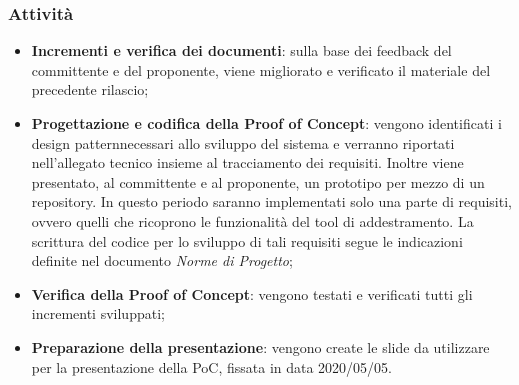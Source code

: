 \subsubsection{Attività}
\begin{itemize}
\item \textbf{Incrementi e verifica dei documenti}: sulla base dei feedback del committente e del proponente, viene migliorato e verificato il materiale del precedente rilascio;
\item \textbf{Progettazione e codifica della Proof of Concept}: vengono identificati i design pattern\glo necessari allo sviluppo del sistema e verranno riportati nell'allegato tecnico insieme al tracciamento dei requisiti. Inoltre viene presentato, al committente e al proponente, un prototipo per mezzo di un repository\glo. In questo periodo saranno implementati solo una parte di requisiti, ovvero quelli che ricoprono le funzionalità del tool di addestramento. La scrittura del codice per lo sviluppo di tali requisiti segue le indicazioni definite nel documento \textit{Norme di Progetto};
\item \textbf{Verifica della Proof of Concept}: vengono testati e verificati tutti gli incrementi sviluppati;
\item \textbf{Preparazione della presentazione}: vengono create le slide da utilizzare per la presentazione della PoC, fissata in data 2020/05/05.
\end{itemize}

